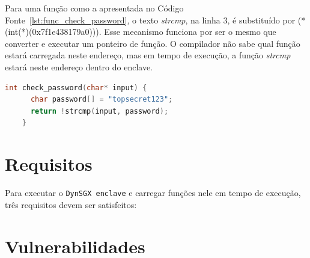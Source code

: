 Para uma função como a apresentada no Código Fonte~\ref{lst:func_check_password},
o texto \textit{strcmp}, na linha 3, é substituído por
{\ttfamily (*(int(*)(0x7f1e438179a0)))}. Esse mecanismo funciona por ser o mesmo
que converter e executar um ponteiro de função. O compilador não sabe qual
função estará carregada neste endereço, mas em tempo de execução, a função
\textit{strcmp} estará neste endereço dentro do enclave.

\begin{lstlisting}[language=C, label=lst:func_check_password, caption={Exemplo
de função que usa um elemento externo (a função \textit{strcmp} ).}]
    int check_password(char* input) {
      char password[] = "topsecret123";
      return !strcmp(input, password);
    }
\end{lstlisting}

\section{Requisitos}
\label{sec:dynsgx_requisitos}

Para executar o \texttt{DynSGX enclave} e carregar funções nele em tempo de
execução, três requisitos devem ser satisfeitos:


\section{Vulnerabilidades}
\label{sec:dynsgx_vulnerabilidades}

